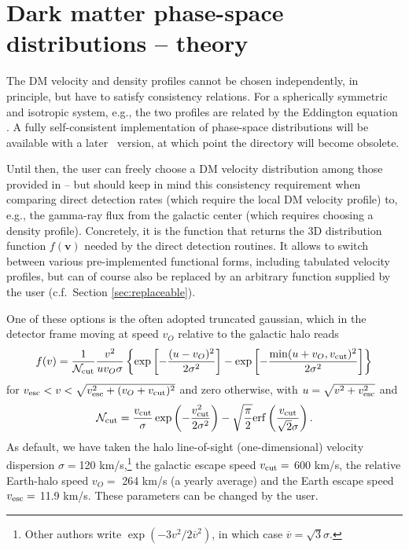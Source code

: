 
\section{Dark matter phase-space distributions -- theory}
\label{sec:dmd_vel}

The DM velocity and density profiles cannot be chosen independently,
in principle, but have to satisfy consistency relations. For 
a spherically symmetric and isotropic system, e.g., the two profiles are related by the 
Eddington equation \cite{1915MNRAS..76...37E,Catena:2011kv}. A fully self-consistent 
implementation of phase-space distributions will be available with a later \ds\ version,
at which point the directory  will become obsolete. 

Until then, the user can freely choose a DM velocity distribution among those provided in 
 -- but should keep in mind this consistency requirement 
when comparing direct detection rates (which require the local DM velocity profile) to, e.g., 
the gamma-ray flux from the galactic center 
(which requires choosing a density profile). Concretely, it is the function 
that returns the 3D distribution function $f(\mathbf{v})$ needed by the direct detection routines. 
It allows to switch between various pre-implemented functional forms, including tabulated
velocity profiles, but can of course also be replaced by an arbitrary function supplied by the user
(c.f.~Section \ref{sec:replaceable}).
 

One of these options is the often adopted truncated gaussian, which in the detector frame 
moving at
speed $v_O$ relative to the galactic halo reads
\begin{equation}
   f(v) = {1\over {\mathcal N}_{\rm cut}} { v^2 \over u v_O \sigma} \left\{
   \exp\left[{-{(u-v_O)^2\over2\sigma^2}}\right] -
   \exp\left[{-{\min(u+v_O,v_{\rm cut})^2\over2\sigma^2}}\right]
   \right\}
\end{equation}
for $ v_{\rm esc} < v < \sqrt{v_{\rm esc}^2 + (v_O + v_{\rm cut} ) ^2
} $ and zero otherwise, with $ u = \sqrt{v^2 + v_{\rm esc}^2} $ and
\begin{equation}
   {\mathcal N}_{\rm cut} =
   {v_{\rm cut}\over\sigma} \exp\left( {-{v_{\rm cut}^2\over2\sigma^2}} \right)
   -
   \sqrt{\pi\over2} {\rm erf} \left( {v_{\rm cut}\over\sqrt{2}\sigma} \right) .
\end{equation}
As default, we have taken the halo line-of-sight (one-dimensional) velocity
dispersion $\sigma = $120 km/s,\footnote{Other authors write
   $\exp(-3v^2/2\overline{v}^2)$, in which case $\overline{v} = \sqrt{3}
   \sigma$.}  the galactic escape speed $ v_{\rm cut} = $ 600 km/s, the relative
Earth-halo speed $ v_O = $ 264 km/s (a yearly average) and the Earth escape
speed $ v_{\rm esc} = $ 11.9 km/s. These parameters can be changed by
the user. 


